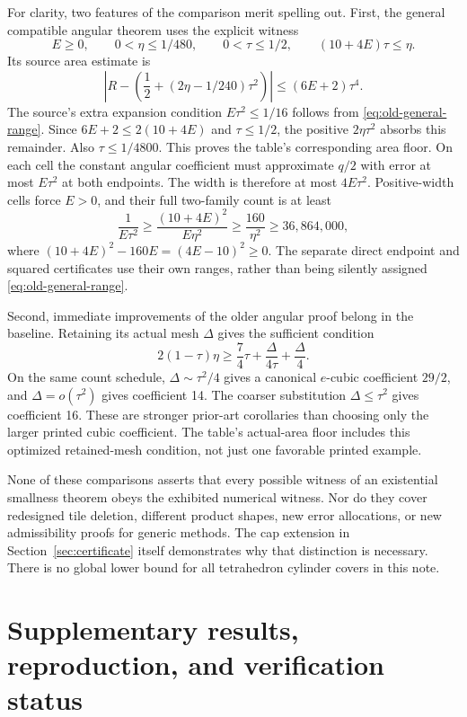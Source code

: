 \documentclass[11pt]{amsart}
\theoremstyle{definition}
\theoremstyle{remark}
\begin{document}
For clarity, two features of the comparison merit spelling out.
First, the general compatible angular theorem uses the explicit
witness~\cite{LeanSources}
\begin{equation}\label{eq:old-general-range}
 E\ge0,\qquad0<\eta\le1/480,\qquad0<\tau\le1/2,
 \qquad(10+4E)\tau\le\eta.
\end{equation}
Its source area estimate is
\[
 \left|R-\left(\frac12+(2\eta-1/240)\tau^2\right)\right|
 \le(6E+2)\tau^4.
\]
The source's extra expansion condition $E\tau^2\le1/16$ follows
from \eqref{eq:old-general-range}. Since
$6E+2\le2(10+4E)$ and $\tau\le1/2$, the positive
$2\eta\tau^2$ absorbs this remainder. Also $\tau\le1/4800$.
This proves the table's corresponding area floor. On each cell the
constant angular coefficient must approximate $q/2$ with error at most
$E\tau^2$ at both endpoints. The width is therefore at most
$4E\tau^2$. Positive-width cells force $E>0$, and their full two-family
count is at least
\[
 \frac1{E\tau^2}\ge\frac{(10+4E)^2}{E\eta^2}
 \ge\frac{160}{\eta^2}\ge36{,}864{,}000,
\]
where $(10+4E)^2-160E=(4E-10)^2\ge0$. The separate direct
endpoint and squared certificates use their own ranges, rather than
being silently assigned \eqref{eq:old-general-range}.

Second, immediate improvements of the older angular proof belong in
the baseline. Retaining its actual mesh $\Delta$ gives the sufficient
condition
\[
 2(1-\tau)\eta\ge\frac74\tau+
                       \frac{\Delta}{4\tau}+\frac\Delta4.
\]
On the same count schedule, $\Delta\sim\tau^2/4$ gives a canonical
$e$-cubic coefficient $29/2$, and $\Delta=o(\tau^2)$ gives coefficient
14. The coarser substitution $\Delta\le\tau^2$ gives coefficient 16.
These are stronger prior-art corollaries than choosing only the larger
printed cubic coefficient. The table's actual-area floor includes this
optimized retained-mesh condition, not just one favorable printed example.

None of these comparisons asserts that every possible witness of an
existential smallness theorem obeys the exhibited numerical witness.
Nor do they cover redesigned tile deletion, different product shapes,
new error allocations, or new admissibility proofs for generic methods.
The cap extension in Section~\ref{sec:certificate} itself demonstrates
why that distinction is necessary. There is no global lower bound for
all tetrahedron cylinder covers in this note.

\section{Supplementary results, reproduction, and verification status}
\end{document}
